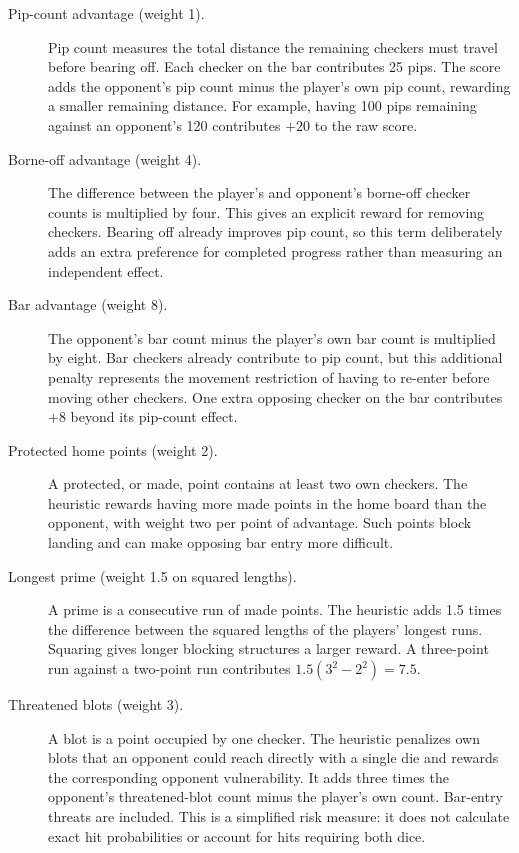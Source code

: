 \documentclass[12pt,twoside]{article}
\begin{document}
\begin{description}
    \item[Pip-count advantage (weight 1).]
    Pip count measures the total distance the remaining checkers must travel
    before bearing off. Each checker on the bar contributes 25 pips. The score
    adds the opponent's pip count minus the player's own pip count, rewarding
    a smaller remaining distance. For example, having 100 pips remaining against
    an opponent's 120 contributes $+20$ to the raw score.

    \item[Borne-off advantage (weight 4).]
    The difference between the player's and opponent's borne-off checker counts
    is multiplied by four. This gives an explicit reward for removing checkers.
    Bearing off already improves pip count, so this term deliberately adds an
    extra preference for completed progress rather than measuring an independent
    effect.

    \item[Bar advantage (weight 8).]
    The opponent's bar count minus the player's own bar count is multiplied by
    eight. Bar checkers already contribute to pip count, but this additional
    penalty represents the movement restriction of having to re-enter before
    moving other checkers. One extra opposing checker on the bar contributes
    $+8$ beyond its pip-count effect.

    \item[Protected home points (weight 2).]
    A protected, or made, point contains at least two own checkers. The heuristic
    rewards having more made points in the home board than the opponent, with
    weight two per point of advantage. Such points block landing and can make
    opposing bar entry more difficult.

    \item[Longest prime (weight 1.5 on squared lengths).]
    A prime is a consecutive run of made points. The heuristic adds 1.5 times
    the difference between the squared lengths of the players' longest runs.
    Squaring gives longer blocking structures a larger reward. A three-point
    run against a two-point run contributes $1.5(3^2-2^2)=7.5$.

    \item[Threatened blots (weight 3).]
    A blot is a point occupied by one checker. The heuristic penalizes own blots
    that an opponent could reach directly with a single die and rewards the
    corresponding opponent vulnerability. It adds three times the opponent's
    threatened-blot count minus the player's own count. Bar-entry threats are
    included. This is a simplified risk measure: it does not calculate exact
    hit probabilities or account for hits requiring both dice.
\end{description}
\end{document}

